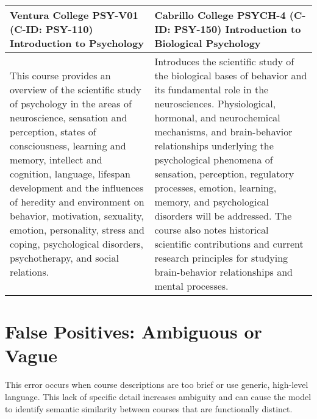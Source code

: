 \begin{longtable}{ >{\baselineskip=12pt}p{} >{\baselineskip=12pt}p{} }
\bottomrule\toprule
Ventura College \newline PSY-V01 (C-ID: PSY-110) \newline Introduction to Psychology & Cabrillo College \newline PSYCH-4 (C-ID: PSY-150) \newline Introduction to Biological Psychology \\
\midrule
This course provides an overview of the scientific study of psychology in the areas of neuroscience, sensation and perception, states of consciousness, learning and memory, intellect and cognition, language, lifespan development and the influences of heredity and environment on behavior, motivation, sexuality, emotion, personality, stress and coping, psychological disorders, psychotherapy, and social relations. & Introduces the scientific study of the biological bases of behavior and its fundamental role in the neurosciences. Physiological, hormonal, and neurochemical mechanisms, and brain-behavior relationships underlying the psychological phenomena of sensation, perception, regulatory processes, emotion, learning, memory, and psychological disorders will be addressed. The course also notes historical scientific contributions and current research principles for studying brain-behavior relationships and mental processes. \\
\bottomrule\toprule
\end{longtable}

\section{False Positives: Ambiguous or Vague}\label{app:fpvague}
This error occurs when course descriptions are too brief or use generic, high-level language. This lack of specific detail increases ambiguity and can cause the model to identify semantic similarity between courses that are functionally distinct.

